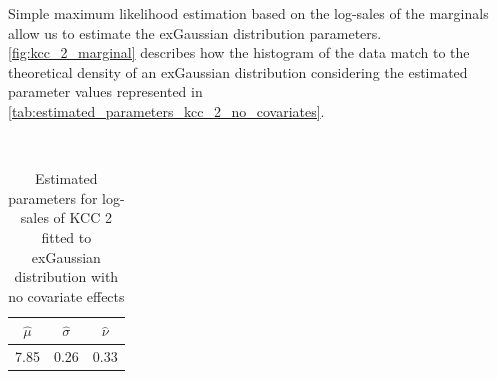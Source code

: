 
Simple maximum likelihood estimation based on the log-sales of the marginals allow us to estimate the exGaussian distribution parameters. \autoref{fig:kcc_2_marginal} describes how the histogram of the data match to the theoretical density of an exGaussian distribution considering the estimated parameter values represented in \autoref{tab:estimated_parameters_kcc_2_no_covariates}.
\\




\begin{table}[H]
\setlength\arrayrulewidth{1pt}  
\centering
\begin{adjustbox}{max width=\textwidth}\
\begin{tabular}{|c|c|c|}
\hline
\rowcolor{lightgray} 
$\hat{\mu}$ & $\hat{\sigma}$ & $\hat{\nu}$ \\ \hline
7.85        & 0.26           & 0.33        \\ \hline
\end{tabular}
\end{adjustbox}
\caption{Estimated parameters for log-sales of KCC 2 fitted to exGaussian distribution with no covariate effects}
\label{tab:estimated_parameters_kcc_2_no_covariates}
\end{table}





